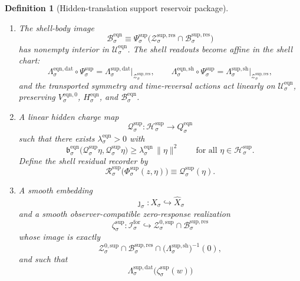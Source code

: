 \documentclass[11pt]{article}
\newcommand{\ForSpace}[1]{\mathcal I_{#1}^{\mathrm{for}}}
\newcommand{\VisibleAffine}[1]{\widehat X_{#1}}
\newcommand{\EqnSpace}[1]{\mathcal U_{#1}^{\mathrm{eqn}}}
\newcommand{\EqnBody}[1]{\mathcal B_{#1}^{\mathrm{eqn}}}
\newcommand{\EqnData}[1]{\Lambda_{#1}^{\mathrm{eqn,dat}}}
\newcommand{\EqnShell}[1]{\Lambda_{#1}^{\mathrm{eqn,sh}}}
\newcommand{\EqnTarget}[1]{Q_{#1}^{\mathrm{eqn}}}
\newcommand{\EqnPair}[1]{\mathfrak b_{#1}^{\mathrm{eqn}}}
\newcommand{\EqnZero}[1]{V_{#1}^{\mathrm{eqn},0}}
\newcommand{\EqnHidden}[1]{H_{#1}^{\mathrm{eqn}}}
\newcommand{\ResBody}[1]{\mathcal B_{#1}^{\mathrm{sup,res}}}
\newcommand{\ResShellSet}[1]{\mathcal Z_{#1}^{\mathrm{sup,res}}}
\newcommand{\ResData}[1]{\Lambda_{#1}^{\mathrm{sup,dat}}}
\newcommand{\ResShellMap}[1]{\Lambda_{#1}^{\mathrm{sup,sh}}}
\newcommand{\ResZeroCore}[1]{\mathcal Z_{#1}^{0,\mathrm{sup}}}
\newcommand{\SeedHidden}[1]{\mathcal H_{#1}^{\mathrm{sup}}}
\newcommand{\ShellChart}[1]{\Psi_{#1}^{\mathrm{sup}}}
\newcommand{\ZeroChart}[1]{\Psi_{#1}^{0}}
\newcommand{\HiddenChart}[1]{\Psi_{#1}^{\mathrm{hid}}}
\newcommand{\SplitMap}[1]{\Phi_{#1}^{\mathrm{sup}}}
\newcommand{\ResResidual}[1]{\mathcal R_{#1}^{\mathrm{sup}}}
\newcommand{\HiddenCharge}[1]{\mathcal Q_{#1}^{\mathrm{sup}}}
\newcommand{\ResEmbed}[1]{\zeta_{#1}^{\mathrm{sup}}}
\newtheorem{definition}{Definition}
\begin{document}
\begin{definition}[Hidden-translation support reservoir package]
\begin{enumerate}
    satisfying
    \begin{equation}
    \ShellChart{\sigma}\bigl(\SplitMap{\sigma}(z,\eta)\bigr)
    =
    \ZeroChart{\sigma}(z)+\HiddenChart{\sigma}(\eta).
    \label{eq:chartsplit}
    \end{equation}
    \item The shell-body image
    \[
    \EqnBody{\sigma}
    \equiv
    \ShellChart{\sigma}\bigl(\ResShellSet{\sigma}\cap\ResBody{\sigma}\bigr)
    \]
    has nonempty interior in \(\EqnSpace{\sigma}\). The shell readouts become affine in the shell chart:
    \begin{equation}
    \EqnData{\sigma}\circ\ShellChart{\sigma}
    =
    \ResData{\sigma}\big|_{\ResShellSet{\sigma}},
    \qquad
    \EqnShell{\sigma}\circ\ShellChart{\sigma}
    =
    \ResShellMap{\sigma}\big|_{\ResShellSet{\sigma}},
    \label{eq:chartreadouts}
    \end{equation}
    and the transported symmetry and time-reversal actions act linearly on \(\EqnSpace{\sigma}\), preserving \(\EqnZero{\sigma}\), \(\EqnHidden{\sigma}\), and \(\EqnBody{\sigma}\).
    \item A linear hidden charge map
    \[
    \HiddenCharge{\sigma}:\SeedHidden{\sigma}\to\EqnTarget{\sigma}
    \]
    such that there exists \(\lambda_{\sigma}^{\mathrm{eqn}}>0\) with
    \begin{equation}
    \EqnPair{\sigma}\bigl(\HiddenCharge{\sigma}\eta,\HiddenCharge{\sigma}\eta\bigr)
    \ge
    \lambda_{\sigma}^{\mathrm{eqn}}\,
    \|\eta\|^{2}
    \qquad
    \text{for all }\eta\in\SeedHidden{\sigma}.
    \label{eq:hiddenchargegap}
    \end{equation}
    Define the shell residual recorder by
    \begin{equation}
    \ResResidual{\sigma}\bigl(\SplitMap{\sigma}(z,\eta)\bigr)
    \equiv
    \HiddenCharge{\sigma}(\eta).
    \label{eq:reservoirresidual}
    \end{equation}
    \item A smooth embedding
    \[
    \jmath_{\sigma}:X_{\sigma}\hookrightarrow\VisibleAffine{\sigma}
    \]
    and a smooth observer-compatible zero-response realization
    \[
    \ResEmbed{\sigma}:\ForSpace{\sigma}\hookrightarrow\ResZeroCore{\sigma}\cap\ResBody{\sigma}
    \]
    whose image is exactly
    \[
    \ResZeroCore{\sigma}\cap\ResBody{\sigma}
    \cap
    \bigl(\ResShellMap{\sigma}\bigr)^{-1}(0),
    \]
    and such that
    \begin{equation}
    \ResData{\sigma}\bigl(\ResEmbed{\sigma}(w)\bigr)

\end{equation}
\end{enumerate}
\end{definition}
\end{document}
